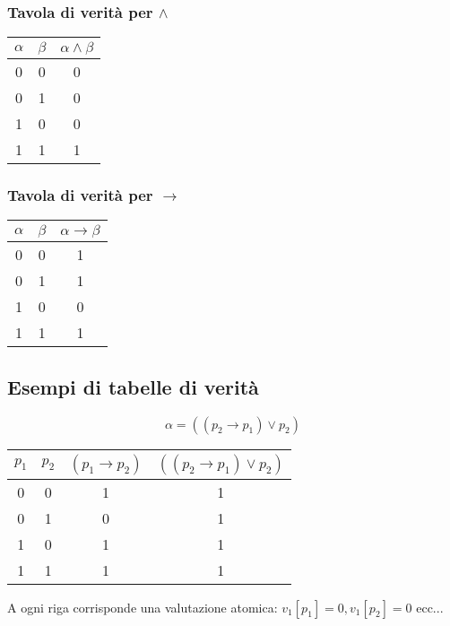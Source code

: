 \documentclass{article}
\theoremstyle{break}
\theoremstyle{break}
\theoremstyle{break}
\theoremstyle{break}
\begin{document}
\subsubsection{Tavola di verità per \( \wedge \) }
\begin{center}
	\begin{tabular}{c|c|c}
		\( \alpha \) & \( \beta \) & \( \alpha \wedge \beta \) \\
		\hline
		0            & 0           & 0                         \\
		0            & 1           & 0                         \\
		1            & 0           & 0                         \\
		1            & 1           & 1                         \\
	\end{tabular}
\end{center}

\subsubsection{Tavola di verità per \( \to  \) }
\begin{center}
	\begin{tabular}{c|c|c}
		\( \alpha \) & \( \beta \) & \( \alpha \to \beta \) \\
		\hline
		0            & 0           & 1                      \\
		0            & 1           & 1                      \\
		1            & 0           & 0                      \\
		1            & 1           & 1                      \\
	\end{tabular}
\end{center}

\subsection{Esempi di tabelle di verità}
\begin{example}
	\[
		\alpha = ((p_2 \to  p_1)\vee p_2)
	\]
	\begin{center}
		\begin{tabular}{c|c|c|c}
			\( p_1 \) & \( p_2 \) & \( (p_1 \to p_2) \) & \( ((p_2 \to  p_1)\vee p_2) \) \\
			\hline
			0         & 0         & 1                   & 1                              \\
			0         & 1         & 0                   & 1                              \\
			1         & 0         & 1                   & 1                              \\
			1         & 1         & 1                   & 1                              \\
		\end{tabular}
	\end{center}
	A ogni riga corrisponde una valutazione atomica: \( v_1[p_1] = 0, v_1[p_2] = 0 \) ecc...
\end{example}
\end{document}
